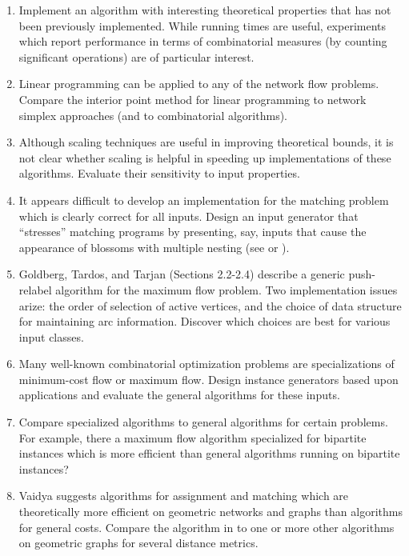 \begin{enumerate}
\item Implement an algorithm with interesting theoretical properties
that has not been  previously implemented.  While running times are
useful, experiments which report performance
in terms of combinatorial measures (by counting significant operations)
are of particular interest.  

\item Linear programming can be applied to any of the network flow problems. 
Compare the interior point method for linear programming to 
network simplex approaches (and to combinatorial algorithms).

\item Although scaling techniques are useful in improving
theoretical bounds, it is not clear whether scaling is helpful
in speeding up implementations of these algorithms.  Evaluate their 
sensitivity to input properties.  

\item It appears difficult to develop an implementation for the
matching problem which is clearly correct for all inputs.  Design an 
input generator that ``stresses'' matching programs by presenting, 
say, inputs that cause the appearance of blossoms with multiple nesting 
(see \cite{edmonds} or \cite{tarjan}).  

\item Goldberg, Tardos, and Tarjan \cite{gtt} (Sections 2.2-2.4) describe a 
generic push-relabel algorithm for the maximum flow problem.  
Two implementation issues arize:  the order of selection of 
active vertices,  and the choice of data structure for maintaining
arc information. Discover which choices are best for 
various input classes.   

\item  Many well-known combinatorial optimization problems are 
specializations of minimum-cost flow or maximum flow.  Design instance
generators based upon applications and evaluate the general algorithms
for these inputs. 

\item Compare specialized algorithms to general algorithms for 
certain problems.  For example, there a maximum flow algorithm specialized
for bipartite instances which is more efficient than general 
algorithms running on bipartite instances?   

\item  Vaidya \cite{vaidya} suggests algorithms for 
assignment and matching which are theoretically 
more efficient on geometric networks and graphs than algorithms
for general costs.  Compare the algorithm in \cite{vaidya} to one or 
more other algorithms on geometric graphs for several distance metrics. 

\end{enumerate} 

